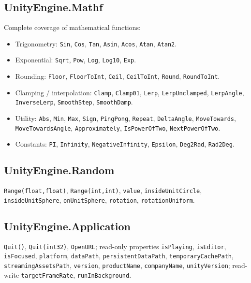 \documentclass[11pt,a4paper]{article}
\newcommand{\code}[1]{\texttt{\small #1}}
\begin{document}
\subsection{UnityEngine.Mathf}

Complete coverage of mathematical functions:

\begin{itemize}[leftmargin=2em, noitemsep]
  \item Trigonometry: \code{Sin}, \code{Cos}, \code{Tan}, \code{Asin},
        \code{Acos}, \code{Atan}, \code{Atan2}.
  \item Exponential: \code{Sqrt}, \code{Pow}, \code{Log}, \code{Log10},
        \code{Exp}.
  \item Rounding: \code{Floor}, \code{FloorToInt}, \code{Ceil},
        \code{CeilToInt}, \code{Round}, \code{RoundToInt}.
  \item Clamping / interpolation: \code{Clamp}, \code{Clamp01},
        \code{Lerp}, \code{LerpUnclamped}, \code{LerpAngle},
        \code{InverseLerp}, \code{SmoothStep}, \code{SmoothDamp}.
  \item Utility: \code{Abs}, \code{Min}, \code{Max}, \code{Sign},
        \code{PingPong}, \code{Repeat}, \code{DeltaAngle},
        \code{MoveTowards}, \code{MoveTowardsAngle}, \code{Approximately},
        \code{IsPowerOfTwo}, \code{NextPowerOfTwo}.
  \item Constants: \code{PI}, \code{Infinity}, \code{NegativeInfinity},
        \code{Epsilon}, \code{Deg2Rad}, \code{Rad2Deg}.
\end{itemize}

\subsection{UnityEngine.Random}

\code{Range(float,float)}, \code{Range(int,int)}, \code{value},
\code{insideUnitCircle}, \code{insideUnitSphere}, \code{onUnitSphere},
\code{rotation}, \code{rotationUniform}.

\subsection{UnityEngine.Application}

\code{Quit()}, \code{Quit(int32)}, \code{OpenURL}; read-only properties
\code{isPlaying}, \code{isEditor}, \code{isFocused}, \code{platform},
\code{dataPath}, \code{persistentDataPath}, \code{temporaryCachePath},
\code{streamingAssetsPath}, \code{version}, \code{productName},
\code{companyName}, \code{unityVersion}; read-write
\code{targetFrameRate}, \code{runInBackground}.
\end{document}
